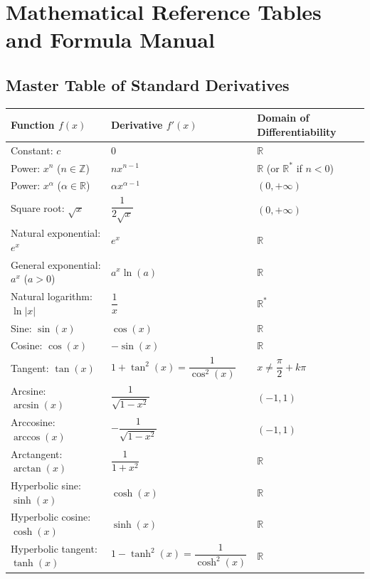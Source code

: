 \chapter{Mathematical Reference Tables and Formula Manual}
\label{app:math_tables}

\section{Master Table of Standard Derivatives}

\renewcommand{\arraystretch}{1.3}
\begin{longtable}{@{}lll@{}}
\toprule
\textbf{Function} $f(x)$ & \textbf{Derivative} $f'(x)$ & \textbf{Domain of Differentiability} \\
\midrule
\endhead
Constant: $c$ & $0$ & $\mathbb{R}$ \\
Power: $x^n$ ($n \in \mathbb{Z}$) & $n x^{n-1}$ & $\mathbb{R}$ (or $\mathbb{R}^*$ if $n < 0$) \\
Power: $x^\alpha$ ($\alpha \in \mathbb{R}$) & $\alpha x^{\alpha-1}$ & $(0, +\infty)$ \\
Square root: $\sqrt{x}$ & $\dfrac{1}{2\sqrt{x}}$ & $(0, +\infty)$ \\
Natural exponential: $e^x$ & $e^x$ & $\mathbb{R}$ \\
General exponential: $a^x$ ($a > 0$) & $a^x \ln(a)$ & $\mathbb{R}$ \\
Natural logarithm: $\ln|x|$ & $\dfrac{1}{x}$ & $\mathbb{R}^*$ \\
Sine: $\sin(x)$ & $\cos(x)$ & $\mathbb{R}$ \\
Cosine: $\cos(x)$ & $-\sin(x)$ & $\mathbb{R}$ \\
Tangent: $\tan(x)$ & $1 + \tan^2(x) = \dfrac{1}{\cos^2(x)}$ & $x \neq \dfrac{\pi}{2} + k\pi$ \\
Arcsine: $\arcsin(x)$ & $\dfrac{1}{\sqrt{1 - x^2}}$ & $(-1, 1)$ \\
Arccosine: $\arccos(x)$ & $-\dfrac{1}{\sqrt{1 - x^2}}$ & $(-1, 1)$ \\
Arctangent: $\arctan(x)$ & $\dfrac{1}{1 + x^2}$ & $\mathbb{R}$ \\
Hyperbolic sine: $\sinh(x)$ & $\cosh(x)$ & $\mathbb{R}$ \\
Hyperbolic cosine: $\cosh(x)$ & $\sinh(x)$ & $\mathbb{R}$ \\
Hyperbolic tangent: $\tanh(x)$ & $1 - \tanh^2(x) = \dfrac{1}{\cosh^2(x)}$ & $\mathbb{R}$ \\
\bottomrule
\end{longtable}

